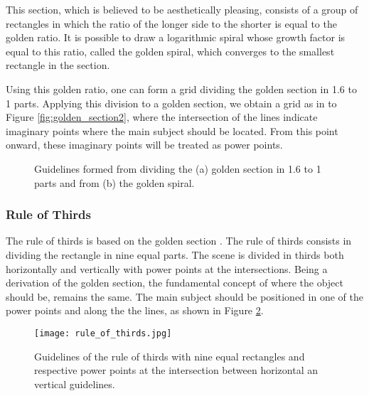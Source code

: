 This section, which is believed to be aesthetically pleasing, consists of a group of rectangles in which the ratio of the longer side to the shorter is equal to the golden ratio. It is possible to draw a logarithmic spiral whose growth factor is equal to this ratio, called the golden spiral, which converges to the smallest rectangle in the section. 

Using this golden ratio, one can form a grid dividing the golden section in 1.6 to 1 parts. Applying this division to a golden section, we obtain a grid as in to Figure \ref{fig:golden_section2}, where the intersection of the lines indicate imaginary points where the main subject should be located. From this point onward, these imaginary points will be treated as power points. 

\begin{figure}[htbp]
        \centering
  \caption{Guidelines formed from dividing the (a) golden section in 1.6 to 1 parts and from (b) the golden spiral.}
  \label{fig:golden_section_image}
\end{figure}

\subsubsection{Rule of Thirds}
\label{subsub:rule_thirds}

The rule of thirds is based on the golden section \cite{Santos}. The rule of thirds consists in dividing the rectangle in nine equal parts. The scene is divided in thirds both horizontally and vertically with power points at the intersections.
Being a derivation of the golden section, the fundamental concept of where the object should be, remains the same. The main subject should be positioned in one of the power points and along the the lines, as shown in Figure \ref{fig:rule_of_thirds_image}.

\begin{figure}[htbp]
    \centering
	\label{fig:rule_of_thirds_example}
    \texttt{[image: rule\_of\_thirds.jpg]}
	\caption{Guidelines of the rule of thirds with nine equal rectangles and respective power points at the intersection between horizontal an vertical guidelines.}
	\label{fig:rule_of_thirds_image}
\end{figure}

